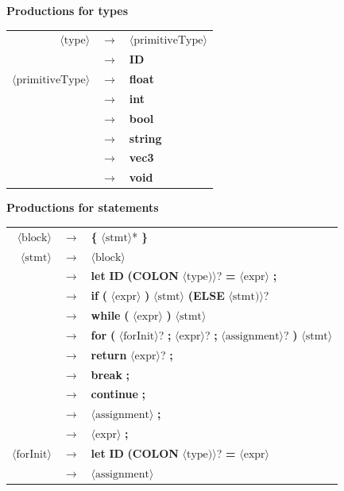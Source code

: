 \documentclass[11pt,a4paper]{article}
\begin{document}
\noindent\textbf{Productions for types}

\begin{longtable}{r c l}
$\langle\text{type}\rangle$ & $\rightarrow$ & $\langle\text{primitiveType}\rangle$ \\
 & $\rightarrow$ & \textbf{ID} \\
$\langle\text{primitiveType}\rangle$ & $\rightarrow$ & \textbf{float} \\
 & $\rightarrow$ & \textbf{int} \\
 & $\rightarrow$ & \textbf{bool} \\
 & $\rightarrow$ & \textbf{string} \\
 & $\rightarrow$ & \textbf{vec3} \\
 & $\rightarrow$ & \textbf{void} \\
\end{longtable}

\noindent\textbf{Productions for statements}

\begin{longtable}{r c l}
$\langle\text{block}\rangle$ & $\rightarrow$ & \textbf{\{} $\langle\text{stmt}\rangle$* \textbf{\}} \\
$\langle\text{stmt}\rangle$ & $\rightarrow$ & $\langle\text{block}\rangle$ \\
 & $\rightarrow$ & \textbf{let} \textbf{ID} \textbf{(COLON} $\langle\text{type)}\rangle$? \textbf{=} $\langle\text{expr}\rangle$ \textbf{;} \\
 & $\rightarrow$ & \textbf{if} \textbf{(} $\langle\text{expr}\rangle$ \textbf{)} $\langle\text{stmt}\rangle$ \textbf{(ELSE} $\langle\text{stmt)}\rangle$? \\
 & $\rightarrow$ & \textbf{while} \textbf{(} $\langle\text{expr}\rangle$ \textbf{)} $\langle\text{stmt}\rangle$ \\
 & $\rightarrow$ & \textbf{for} \textbf{(} $\langle\text{forInit}\rangle$? \textbf{;} $\langle\text{expr}\rangle$? \textbf{;} $\langle\text{assignment}\rangle$? \textbf{)} $\langle\text{stmt}\rangle$ \\
 & $\rightarrow$ & \textbf{return} $\langle\text{expr}\rangle$? \textbf{;} \\
 & $\rightarrow$ & \textbf{break} \textbf{;} \\
 & $\rightarrow$ & \textbf{continue} \textbf{;} \\
 & $\rightarrow$ & $\langle\text{assignment}\rangle$ \textbf{;} \\
 & $\rightarrow$ & $\langle\text{expr}\rangle$ \textbf{;} \\
$\langle\text{forInit}\rangle$ & $\rightarrow$ & \textbf{let} \textbf{ID} \textbf{(COLON} $\langle\text{type)}\rangle$? \textbf{=} $\langle\text{expr}\rangle$ \\
 & $\rightarrow$ & $\langle\text{assignment}\rangle$ \\
\end{longtable}
\end{document}
